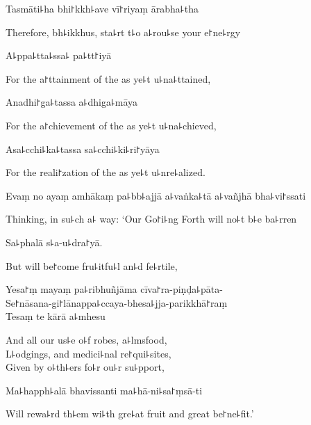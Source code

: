 Tasmāti꜕ha bhi꜓kkh꜕ave vī꜓riyaṃ ārabha꜕tha

\begin{english}
  Therefore, bh꜕ikkhus, sta꜕rt t꜕o a꜕rou꜕se your e꜓ne꜕rgy
\end{english}

A꜕ppa꜕tta꜕ssa꜕ pa꜕tt꜓iyā

\begin{english}
  For the a꜓ttainment of the as ye꜕t u꜕na꜕ttained,
\end{english}

Anadhi꜓ga꜕tassa a꜕dhiga꜕māya

\begin{english}
  For the a꜓chievement of the as ye꜕t u꜕na꜕chieved,
\end{english}

Asa꜕cchi꜕ka꜕tassa sa꜕cchi꜕ki꜕ri꜓yāya

\begin{english}
  For the reali꜓zation of the as ye꜕t u꜕nre꜕alized.
\end{english}

Evaṃ no ayaṃ amhākaṃ pa꜕bb꜕ajjā a꜕vaṅka꜕tā a꜕vañjhā bha꜕vi꜓ssati

\begin{english}
  Thinking, in su꜕ch a꜕ way: `Our Go꜓i꜕ng Forth will no꜕t b꜕e ba꜕rren
\end{english}

Sa꜕phalā s꜕a-u꜕dra꜓yā.

\begin{english}
  But will be꜓come fru꜕itfu꜕l an꜕d fe꜕rtile,
\end{english}

Yesa꜓ṃ mayaṃ pa꜕ribhuñjāma cīva꜓ra-piṇḍa꜕pāta-\\
Se꜓nāsana-gi꜓lānappa꜕ccaya-bhesa꜕jja-parikkhā꜓raṃ\\
Tesaṃ te kārā a꜕mhesu

\begin{english}
  And all our us꜕e o꜕f robes, a꜕lmsfood,\\
  L꜕odgings, and medici꜕nal re꜓qui꜕sites,\\
  Given by o꜕th꜕ers fo꜕r ou꜕r su꜕pport,
\end{english}

Ma꜕happh꜕alā bhavissanti ma꜕hā-ni꜕sa꜓ṃsā-ti

\begin{english}
  Will rewa꜕rd th꜕em wi꜕th gre꜕at fruit and great be꜓ne꜕fit.'
\end{english}

